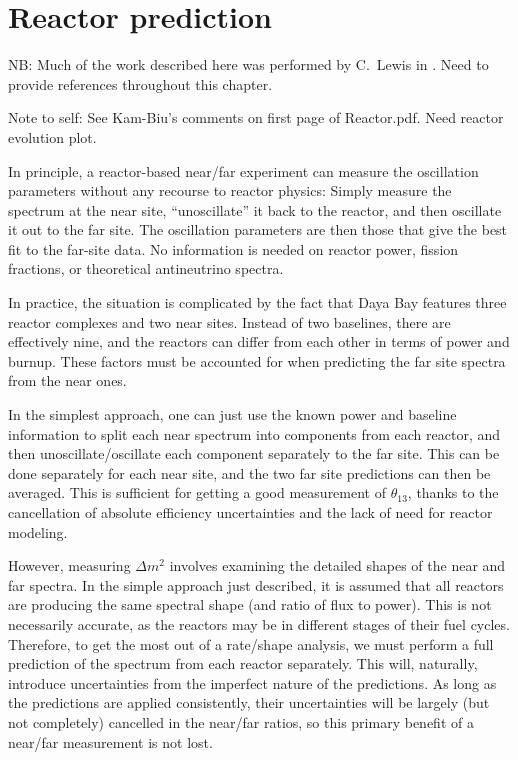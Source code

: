 \documentclass[../thesis.tex]{subfiles}
\begin{document}
\chapter{Reactor prediction}
\label{chap:reactor}

NB: Much of the work described here was performed by C.~Lewis in \cite{Lewis}. Need to provide references throughout this chapter.

Note to self: See Kam-Biu's comments on first page of Reactor.pdf. Need reactor evolution plot.

In principle, a reactor-based near/far experiment can measure the oscillation parameters without any recourse to reactor physics: Simply measure the spectrum at the near site, ``unoscillate'' it back to the reactor, and then oscillate it out to the far site. The oscillation parameters are then those that give the best fit to the far-site data. No information is needed on reactor power, fission fractions, or theoretical antineutrino spectra.

In practice, the situation is complicated by the fact that Daya Bay features three reactor complexes and two near sites. Instead of two baselines, there are effectively nine, and the reactors can differ from each other in terms of power and burnup. These factors must be accounted for when predicting the far site spectra from the near ones.

In the simplest approach, one can just use the known power and baseline information to split each near spectrum into components from each reactor, and then unoscillate/oscillate each component separately to the far site. This can be done separately for each near site, and the two far site predictions can then be averaged. This is sufficient for getting a good measurement of $\theta_{13}$, thanks to the cancellation of absolute efficiency uncertainties and the lack of need for reactor modeling.

However, measuring $\Delta m^2$ involves examining the detailed shapes of the near and far spectra. In the simple approach just described, it is assumed that all reactors are producing the same spectral shape (and ratio of flux to power). This is not necessarily accurate, as the reactors may be in different stages of their fuel cycles. Therefore, to get the most out of a rate/shape analysis, we must perform a full prediction of the spectrum from each reactor separately. This will, naturally, introduce uncertainties from the imperfect nature of the predictions. As long as the predictions are applied consistently, their uncertainties will be largely (but not completely) cancelled in the near/far ratios, so this primary benefit of a near/far measurement is not lost.
\end{document}
